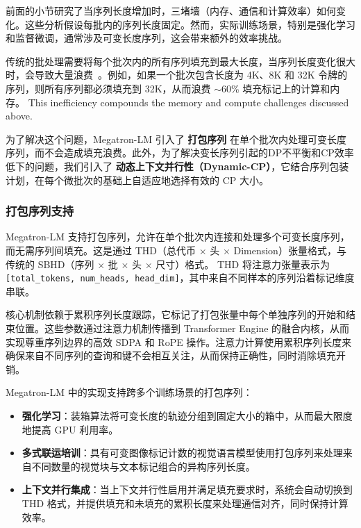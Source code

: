前面的小节研究了当序列长度增加时，三堵墙（内存、通信和计算效率）如何变化。这些分析假设每批内的序列长度固定。然而，实际训练场景，特别是强化学习和监督微调，通常涉及可变长度序列，这会带来额外的效率挑战。

传统的批处理需要将每个批次内的所有序列填充到最大长度，当序列长度变化很大时，会导致大量浪费~\cite{krell2021efficient}。例如，如果一个批次包含长度为 4K、8K 和 32K 令牌的序列，则所有序列都必须填充到 32K，从而浪费 $\sim$60\% 填充标记上的计算和内存。 This inefficiency compounds the memory and compute challenges discussed above.

为了解决这个问题，Megatron-LM 引入了 \textbf{打包序列} 在单个批次内处理可变长度序列，而不会造成填充浪费。此外，为了解决变长序列引起的DP不平衡和CP效率低下的问题，我们引入了 \textbf{动态上下文并行性（Dynamic-CP）}，它结合序列包装计划，在每个微批次的基础上自适应地选择有效的 CP 大小。

\subsubsection{打包序列支持}\label{subsec:packed_sequence_support}

Megatron-LM 支持打包序列，允许在单个批次内连接和处理多个可变长度序列，而无需序列间填充。这是通过 THD（总代币 $\times$ 头 $\times$ Dimension）张量格式，与传统的 SBHD（序列 $\times$ 批 $\times$ 头 $\times$ 尺寸）格式。 THD 将注意力张量表示为 \texttt{[total\_tokens, num\_heads, head\_dim]}，其中来自不同样本的序列沿着标记维度串联。

核心机制依赖于累积序列长度跟踪，它标记了打包张量中每个单独序列的开始和结束位置。这些参数通过注意力机制传播到 Transformer Engine 的融合内核，从而实现尊重序列边界的高效 SDPA 和 RoPE 操作。注意力计算使用累积序列长度来确保来自不同序列的查询和键不会相互关注，从而保持正确性，同时消除填充开销。

Megatron-LM 中的实现支持跨多个训练场景的打包序列：
\begin{itemize}
    \item \textbf{强化学习}：装箱算法将可变长度的轨迹分组到固定大小的箱中，从而最大限度地提高 GPU 利用率。
    \item \textbf{多式联运培训}：具有可变图像标记计数的视觉语言模型使用打包序列来处理来自不同数量的视觉块与文本标记组合的异构序列长度。
    \item \textbf{上下文并行集成}：当上下文并行性启用并满足填充要求时，系统会自动切换到 THD 格式，并提供填充和未填充的累积长度来处理通信对齐，同时保持计算效率。
\end{itemize}

